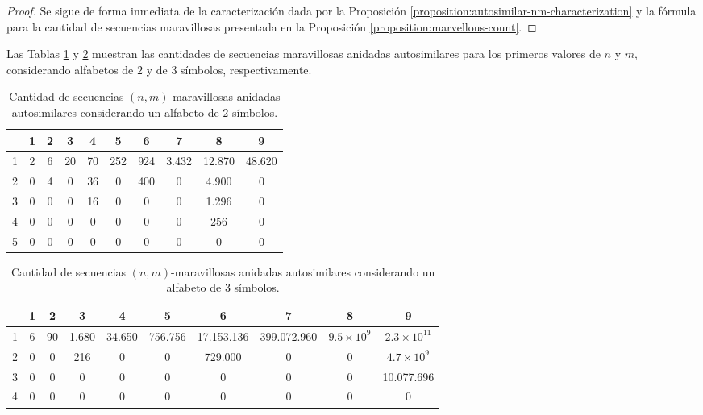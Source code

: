 \begin{proof}
	Se sigue de forma inmediata de la caracterización dada por la Proposición
	\ref{proposition:autosimilar-nm-characterization} y la fórmula para la cantidad de
	secuencias maravillosas presentada en la Proposición \ref{proposition:marvellous-count}.
\end{proof}

Las Tablas \ref{table:count-autosimilar-2} y \ref{table:count-autosimilar-3}
muestran las cantidades de secuencias maravillosas anidadas
autosimilares para los primeros valores de $n$ y $m$, considerando alfabetos
de $2$ y de $3$ símbolos, respectivamente.

\begin{table}[H]
	\centering
	\small
	\begin{tabular}{|c|c|c|c|c|c|c|c|c|c|}
		\hline
		\diagbox[width=3em]{$n$}{$m$}	& 1 & 2 & 3  & 4  & 5   & 6   & 7    & 8     & 9     \\
		\hline
		1 & 2 & 6 & 20 & 70 & 252 & 924 & 3.432 & 12.870 & 48.620
		\\ \hline
		2 & 0 & 4 & 0  & 36 & 0   & 400 & 0     & 4.900  & 0     \\
		\hline
		3 & 0 & 0 & 0  & 16 & 0   & 0   & 0     & 1.296  & 0     \\
		\hline
		4 & 0 & 0 & 0  & 0  & 0   & 0   & 0     & 256    & 0     \\
		\hline
		5 & 0 & 0 & 0  & 0  & 0   & 0   & 0     & 0      & 0     \\
		\hline
	\end{tabular}
	\caption{Cantidad de secuencias $(n,m)$-maravillosas anidadas autosimilares
		considerando un alfabeto de $2$ símbolos.}
	\label{table:count-autosimilar-2}
\end{table}

\begin{table}[H]
	\centering
	\small
	\begin{tabular}{|c|c|c|c|c|c|c|c|c|c|}
		\hline
		\diagbox[width=3em]{$n$}{$m$} & 1 & 2 & 3 & 4 & 5 & 6 & 7 & 8 & 9 \\ \hline
		1 & 6 & 90 & 1.680 & 34.650 & 756.756 & 17.153.136 & 399.072.960 & $9.5 \times 10^{9}$ & $2.3 \times 10^{11}$ \\ \hline
		2 & 0 & 0  & 216   & 0      & 0       & 729.000    & 0           & 0             & $4.7 \times 10^{9}$ \\ \hline
		3 & 0 & 0  & 0     & 0      & 0       & 0          & 0           & 0             & 10.077.696    \\ \hline
		4 & 0 & 0  & 0     & 0      & 0       & 0          & 0           & 0             & 0 \\
		\hline
	\end{tabular}
	\caption{Cantidad de secuencias $(n,m)$-maravillosas anidadas autosimilares
		considerando un alfabeto de $3$ símbolos.}
	\label{table:count-autosimilar-3}
\end{table}

